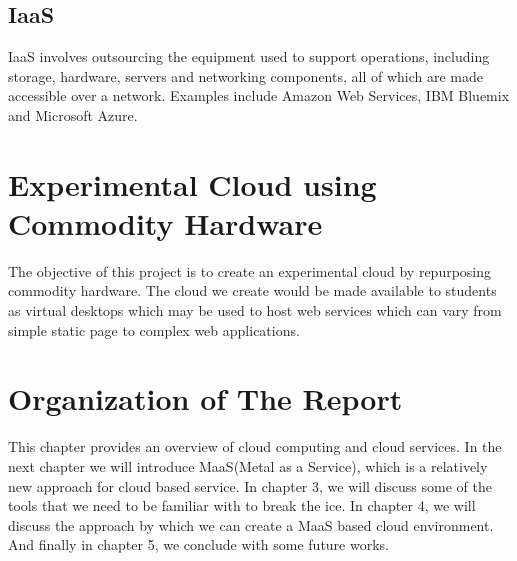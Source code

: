 \subsection{IaaS}
IaaS involves outsourcing the equipment used to support operations, including storage, hardware, servers and networking components, all of which are made accessible over a network. Examples include Amazon Web Services, IBM Bluemix and Microsoft Azure.

\section{Experimental Cloud using Commodity Hardware}

The objective of this project is to create an experimental
cloud by repurposing commodity hardware. The cloud we create would
be made available to students as virtual desktops which may be used
to host web services which can vary from simple static page to
complex web applications. 

\section{Organization of The Report}

This chapter provides an overview of cloud computing and cloud services.
In the next chapter we will introduce MaaS(Metal as a Service), which is a relatively new approach for cloud based service. 
In chapter 3, we will discuss some of the tools that we need to be familiar with to break the ice. In chapter 4, we will discuss the approach by which we can create a MaaS based cloud environment. And finally in chapter 5, we conclude with some future works.
